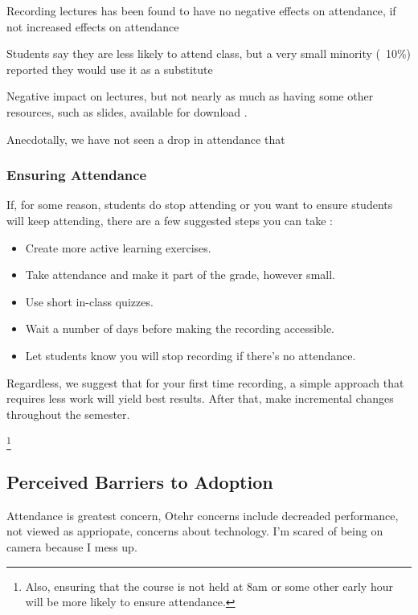 \documentclass[sigconf]{acmart}
\begin{document}
Recording lectures has been found to have no negative effects on attendance, if not increased effects on attendance \cite{shimoff2001effects}


Students say they are less likely to attend class, but a very small minority (~10\%) reported they would use it as a substitute \cite{maynor2013student}

Negative impact on lectures, but not nearly as much as having some other resources, such as slides, available for download 
\cite{traphagan2010impact}.

Anecdotally, we have not seen a drop in attendance that 

\subsubsection{Ensuring Attendance}
If, for some reason, students do stop attending or you want to ensure students will keep attending, there are a few suggested steps you can take \cite{larkin2010but} \cite{young2008lectures}:
\begin{itemize}
	\item Create more active learning exercises.
	
	\item Take attendance and make it part of the grade, however small.
	\item Use short in-class quizzes.
	\item Wait a number of days before making the recording accessible.
	\item Let students know you will stop recording if there's no attendance. 
\end{itemize}

Regardless, we suggest that for your first time recording, a simple approach that requires less work will yield best results.  
After that, make incremental changes throughout the semester.

\footnote{Also, ensuring that the course is not held at 8am or some other early hour will be more likely to ensure attendance.}

\subsection{Perceived Barriers to Adoption}
Attendance is greatest concern,\cite{maynor2013student}
Otehr concerns include decreaded performance, not viewed as appriopate, concerns about technology.\cite{maynor2013student}
I'm scared of being on camera because I mess up.
\end{document}

